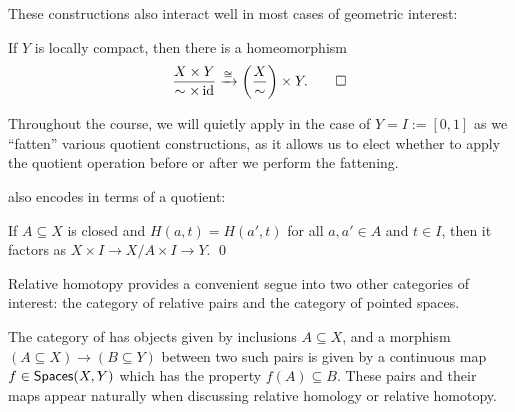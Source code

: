\noindent
These constructions also interact well in most cases of geometric interest:

\begin{lemma}\label{ProdQuotInterchange}
If $Y$ is locally compact, then there is a homeomorphism \[\frac{X \times Y}{\sim \times \operatorname{id}} \xrightarrow{\cong} \left( \frac{X}{\sim}\right) \times Y. \qed\]
\end{lemma}

\begin{remark}
Throughout the course, we will quietly apply  in the case of $Y = I := [0, 1]$ as we ``fatten'' various quotient constructions, as it allows us to elect whether to apply the quotient operation before or after we perform the fattening.
\end{remark}

\noindent
{} also encodes  in terms of a quotient:


\begin{corollary}
If $A \subseteq X$ is closed and $H(a, t) = H(a', t)$ for all $a, a' \in A$ and $t \in I$, then it factors as $X \times I \to X/A \times I \to Y$. \qed
\end{corollary}

Relative homotopy provides a convenient segue into two other categories of interest: the category of relative pairs and the category of pointed spaces.

\begin{definition}
The category of  has objects given by inclusions $A \subseteq X$, and a morphism $(A \subseteq X) \to (B \subseteq Y)$ between two such pairs is given by a continuous map $f \in \mathsf{Spaces}(X, Y)$ which has the property $f(A) \subseteq B$.
These pairs and their maps appear naturally when discussing relative homology or relative homotopy.
\end{definition}

